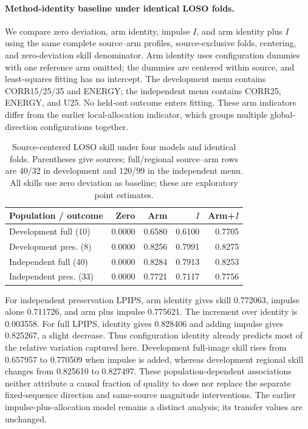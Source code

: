 \paragraph{Method-identity baseline under identical LOSO folds.}
We compare zero deviation, arm identity, impulse $I$, and arm identity plus $I$ using the same complete source--arm profiles, source-exclusive folds, centering, and zero-deviation skill denominator. Arm identity uses configuration dummies with one reference arm omitted; the dummies are centered within source, and least-squares fitting has no intercept. The development menu contains CORR15/25/35 and ENERGY; the independent menu contains CORR25, ENERGY, and U25. No held-out outcome enters fitting. These arm indicators differ from the earlier local-allocation indicator, which groups multiple global-direction configurations together.

\begin{table}[t]
\centering\small
\caption{Source-centered LOSO skill under four models and identical folds. Parentheses give sources; full/regional source--arm rows are 40/32 in development and 120/99 in the independent menu. All skills use zero deviation as baseline; these are exploratory point estimates.}
\label{tab:arm-identity-loso}
\setlength{\tabcolsep}{2.5pt}
\begin{tabular}{lrrrr}
\toprule
Population / outcome & Zero & Arm & $I$ & Arm+$I$\\
\midrule
Development full (10) & 0.0000 & 0.6580 & 0.6100 & 0.7705\\
Development pres. (8) & 0.0000 & 0.8256 & 0.7991 & 0.8275\\
Independent full (40) & 0.0000 & 0.8284 & 0.7913 & 0.8253\\
Independent pres. (33) & 0.0000 & 0.7721 & 0.7117 & 0.7756\\
\bottomrule
\end{tabular}
\end{table}

For independent preservation LPIPS, arm identity gives skill 0.772063, impulse alone 0.711726, and arm plus impulse 0.775621. The increment over identity is 0.003558. For full LPIPS, identity gives 0.828406 and adding impulse gives 0.825267, a slight decrease. Thus configuration identity already predicts most of the relative variation captured here. Development full-image skill rises from 0.657957 to 0.770509 when impulse is added, whereas development regional skill changes from 0.825610 to 0.827497. These population-dependent associations neither attribute a causal fraction of quality to dose nor replace the separate fixed-sequence direction and same-source magnitude interventions. The earlier impulse-plus-allocation model remains a distinct analysis; its transfer values are unchanged.

